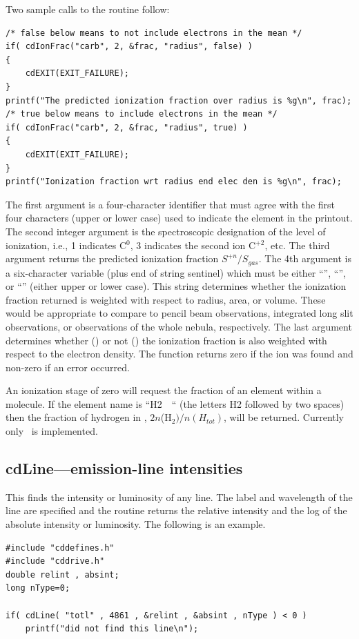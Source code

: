 Two sample calls to the routine follow:
\begin{verbatim}
/* false below means to not include electrons in the mean */
if( cdIonFrac("carb", 2, &frac, "radius", false) )
{
    cdEXIT(EXIT_FAILURE);
}
printf("The predicted ionization fraction over radius is %g\n", frac);
/* true below means to include electrons in the mean */
if( cdIonFrac("carb", 2, &frac, "radius", true) )
{
    cdEXIT(EXIT_FAILURE);
}
printf("Ionization fraction wrt radius end elec den is %g\n", frac);
\end{verbatim}
The first argument is a four-character identifier that must agree with the
first four characters (upper or lower case) used to indicate the element
in the printout.  The second integer argument is the spectroscopic
designation of the level of ionization, i.e., 1 indicates C$^0$,
3 indicates the second ion C$^{+2}$, etc.
The third argument returns the predicted ionization
fraction $S^{+n}/S_{gas}$.
The 4th argument is a six-character variable (plus end
of string sentinel) which must be either ``'', ``'', or
``'' (either
upper or lower case).
This string determines whether the ionization fraction
returned is weighted with respect to radius, area, or volume.
These would be appropriate to compare to pencil beam observations,
integrated long slit observations, or observations of the whole nebula, respectively.
The last argument
determines whether () or not ()
the ionization fraction is also
weighted with respect to the electron density.
The function returns zero
if the ion was found and non-zero if an error occurred.

An ionization stage of zero will request the fraction of an element
within a molecule.
If the element name is ``H2~~`` (the letters H2 followed
by two spaces) then the fraction of hydrogen in \htwo,
$2n$(H$_2)/n(H_{tot})$, will
be returned.  Currently only \htwo\ is implemented.

\subsection{cdLine---emission-line intensities }

This finds the intensity or luminosity of any line.  The label and
wavelength of the line are specified and the routine returns the relative
intensity and the log of the absolute intensity or luminosity.
The following is an example.
\begin{verbatim}
#include "cddefines.h"
#include "cddrive.h"
double relint , absint;
long nType=0;

if( cdLine( "totl" , 4861 , &relint , &absint , nType ) < 0 )
    printf("did not find this line\n");
\end{verbatim}


